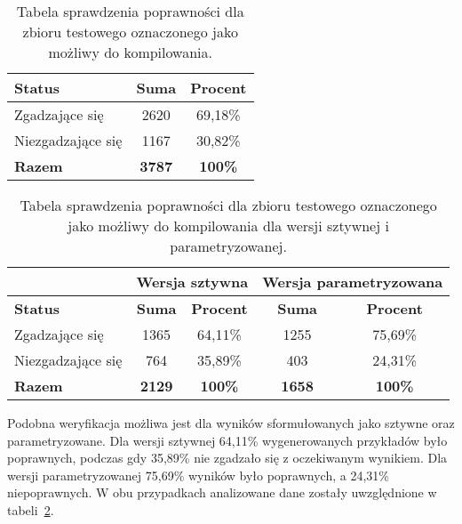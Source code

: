 \begin{table}[H]
\caption{Tabela sprawdzenia poprawności dla zbioru testowego oznaczonego jako możliwy do kompilowania.}\label{tab:tabela7}
\centering%
\begin{tabular}{|l|c|c|}
\hline
\textbf{Status} & \textbf{Suma} & \textbf{Procent} \\
\hline
Zgadzające się & 2620 & 69,18\% \\
\hline
Niezgadzające się & 1167 & 30,82\% \\
\hline
\textbf{Razem} & \textbf{3787} & \textbf{100\%} \\
\hline
\end{tabular}
\end{table}

\begin{table}[H]
\caption{Tabela sprawdzenia poprawności dla zbioru testowego oznaczonego jako możliwy do kompilowania dla wersji sztywnej i parametryzowanej.}\label{tab:experiment:combined_check}
\centering%
\begin{tabular}{|l|c|c|c|c|}
\hline
 & \multicolumn{2}{c|}{\textbf{Wersja sztywna}} & \multicolumn{2}{c|}{\textbf{Wersja parametryzowana}} \\
\hline
\textbf{Status} & \textbf{Suma} & \textbf{Procent} & \textbf{Suma} & \textbf{Procent} \\
\hline
Zgadzające się & 1365 & 64,11\% & 1255 & 75,69\% \\
\hline
Niezgadzające się & 764 & 35,89\% & 403 & 24,31\% \\
\hline
\textbf{Razem} & \textbf{2129} & \textbf{100\%} & \textbf{1658} & \textbf{100\%} \\
\hline
\end{tabular}
\end{table}

Podobna weryfikacja możliwa jest dla wyników sformułowanych jako sztywne oraz parametryzowane. Dla wersji sztywnej 64,11\% wygenerowanych przykładów było poprawnych, podczas gdy 35,89\% nie zgadzało się z oczekiwanym wynikiem. Dla wersji parametryzowanej 75,69\% wyników było poprawnych, a 24,31\% niepoprawnych. W obu przypadkach analizowane dane zostały uwzględnione w tabeli~\ref{tab:experiment:combined_check}.


